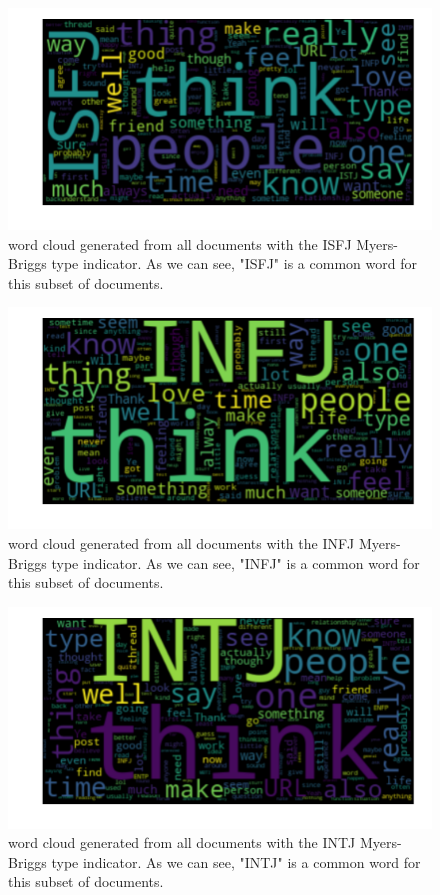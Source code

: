 \begin{figure}[htp] 
  \caption{word cloud generated from all documents with the ISFJ Myers-Briggs type indicator. As we can see, "ISFJ" is a common word for this subset of documents.}
  \label{fig:wordcloud-ISFJ}
  \includegraphics[scale=0.65]{wordclouds/wordcloud_ISFJ.pdf}
\end{figure}

\begin{figure}[htp] 
  \caption{word cloud generated from all documents with the INFJ Myers-Briggs type indicator. As we can see, "INFJ" is a common word for this subset of documents.}
  \label{fig:wordcloud-INFJ}
  \includegraphics[scale=0.65]{wordclouds/wordcloud_INFJ.pdf}
\end{figure}

\begin{figure}[htp] 
  \caption{word cloud generated from all documents with the INTJ Myers-Briggs type indicator. As we can see, "INTJ" is a common word for this subset of documents.}
  \label{fig:wordcloud-INTJ}
  \includegraphics[scale=0.65]{wordclouds/wordcloud_INTJ.pdf}
\end{figure}


